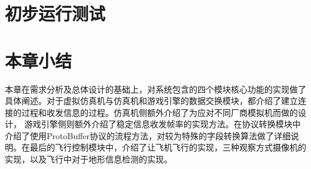 \section{初步运行测试}
\section{本章小结}
本章在需求分析及总体设计的基础上，对系统包含的四个模块核心功能的实现做了具体阐述。对于虚拟仿真机与仿真机和游戏引擎的数据交换模块，都介绍了建立连接的过程和收发信息的过程。仿真机侧额外介绍了为应对不同厂商模拟机而做的设计，
游戏引擎侧则额外介绍了稳定信息收发帧率的实现方法。在协议转换模块中介绍了使用ProtoBuffer协议的流程方法，对较为特殊的字段转换算法做了详细说明。在最后的飞行控制模块中，介绍了让飞机飞行的实现，三种观察方式摄像机的实现，以及飞行中对于地形信息检测的实现。